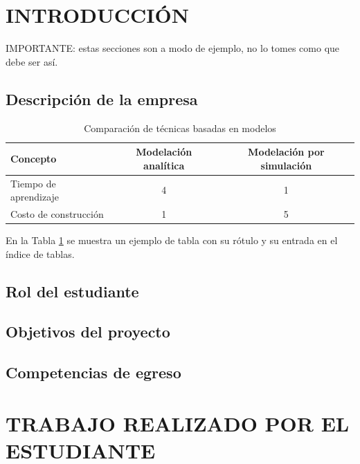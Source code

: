 
\section{INTRODUCCIÓN}

IMPORTANTE: estas secciones son a modo de ejemplo, no lo tomes como que debe ser así.

\subsection{Descripción de la empresa}

\begin{table}[H]
    \centering
    \caption{Comparación de técnicas basadas en modelos}
    \label{tab:ejemplo}
    \begin{tabular}{lcc}
        \hline
        Concepto              & Modelación analítica & Modelación por simulación \\
        \hline
        Tiempo de aprendizaje & 4                    & 1                         \\
        Costo de construcción & 1                    & 5                         \\
        \hline
    \end{tabular}
\end{table}

En la Tabla \ref{tab:ejemplo} se muestra un ejemplo de tabla con su rótulo y su
entrada en el índice de tablas.

\subsection{Rol del estudiante}

\subsection{Objetivos del proyecto}



\subsection{Competencias de egreso}

\newpage
\section{TRABAJO REALIZADO POR EL ESTUDIANTE}

